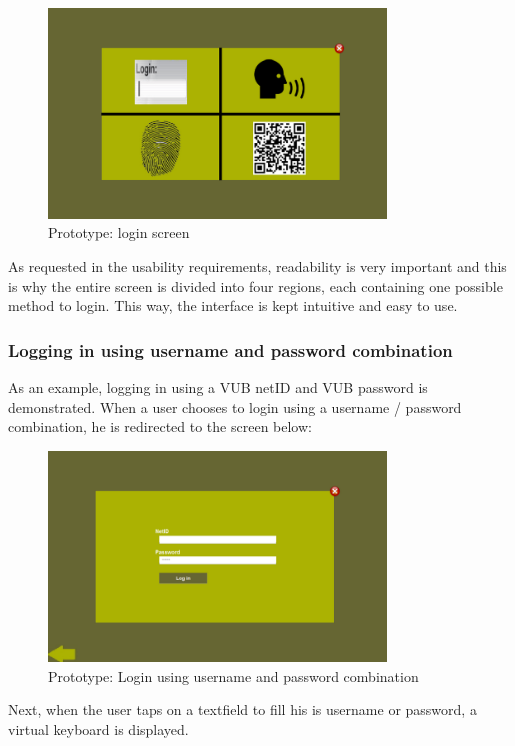 \documentclass[11pt, a4paper,svglistings]{report}
\begin{document}
\begin{figure}[H]
\centering
    \includegraphics[width=0.8\textwidth]{Prototypes/Login.png}
  \caption{Prototype: login screen}
\end{figure}
As requested in the usability requirements, readability is very important and this is why the entire screen is divided into four regions, each containing one possible method to login. This way, the interface is kept intuitive and easy to use.


\subsubsection{Logging in using username and password combination}

As an example, logging in using a VUB netID and VUB password is demonstrated. When a user chooses to login using a username / password combination, he is redirected to the screen below:


\begin{figure}[H]
\centering
    \includegraphics[width=0.8\textwidth]{Prototypes/LoginNamePass.png}
  \caption{Prototype: Login using username and password combination}
\end{figure}
Next, when the user taps on a textfield to fill his is username or password, a virtual keyboard is displayed.
\end{document}
